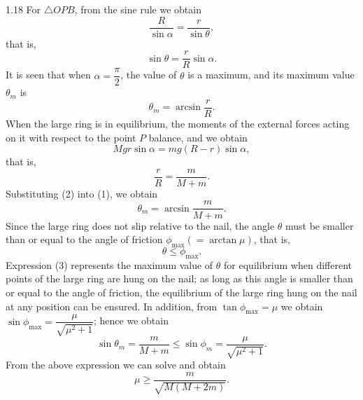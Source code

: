 \begin{solution}{1.18}
For $\triangle OPB$, from the sine rule we obtain
\[
\frac{R}{\sin\alpha}=\frac{r}{\sin\theta},
\]
that is,
\[
\sin\theta=\frac{r}{R}\sin\alpha.
\]
It is seen that when $\alpha=\dfrac{\pi}{2}$, the value of $\theta$ is a maximum, and its maximum value $\theta_m$ is
\begin{equation}
\theta_m=\arcsin\frac{r}{R}. \tag{1}
\end{equation}
When the large ring is in equilibrium, the moments of the external forces acting on it with respect to the point $P$ balance, and we obtain
\[
Mgr\sin\alpha=mg(R-r)\sin\alpha,
\]
that is,
\begin{equation}
\frac{r}{R}=\frac{m}{M+m}. \tag{2}
\end{equation}
Substituting (2) into (1), we obtain
\begin{equation}
\theta_m=\arcsin\frac{m}{M+m}. \tag{3}
\end{equation}
Since the large ring does not slip relative to the nail, the angle $\theta$ must be smaller than or equal to the angle of friction $\phi_{\max}(=\arctan\mu)$, that is,
\begin{equation}
\theta\leq\phi_{\max}. \tag{4}
\end{equation}
Expression (3) represents the maximum value of $\theta$ for equilibrium when different points of the large ring are hung on the nail; as long as this angle is smaller than or equal to the angle of friction, the equilibrium of the large ring hung on the nail at any position can be ensured. In addition, from $\tan\phi_{\max}=\mu$ we obtain $\sin\phi_{\max}=\dfrac{\mu}{\sqrt{\mu^2+1}}$; hence we obtain
\[
\sin\theta_m=\frac{m}{M+m}\leq\sin\phi_m=\frac{\mu}{\sqrt{\mu^2+1}}.
\]
From the above expression we can solve and obtain
\[
\mu\geq\frac{m}{\sqrt{M(M+2m)}}.
\]
\end{solution}

